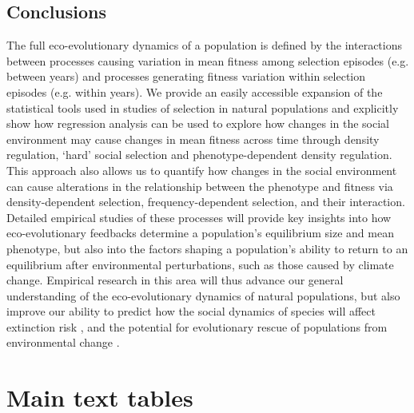\documentclass{article}
\begin{document}
\subsection{Conclusions}
 The full eco-evolutionary dynamics of a population is defined by the interactions between processes causing variation in mean fitness among selection episodes (e.g. between years) and processes generating fitness variation within selection episodes (e.g. within years). We provide an easily accessible expansion of the statistical tools used in studies of selection in natural populations and explicitly show how regression analysis can be used to explore how changes in the social environment may cause changes in mean fitness across time through density regulation, `hard' social selection and phenotype-dependent density regulation. This approach also allows us to quantify how changes in the social environment can cause alterations in the relationship between the phenotype and fitness via density-dependent selection, frequency-dependent selection, and their interaction. Detailed empirical studies of these processes will provide key insights into how eco-evolutionary feedbacks determine a population's equilibrium size and mean phenotype, but also into the factors shaping a population's ability to return to an equilibrium after environmental perturbations, such as those caused by climate change. Empirical research in this area will thus advance our general understanding of the eco-evolutionary dynamics of natural populations, but also improve our ability to predict how the social dynamics of species will affect extinction risk \citep{Angulo2018}, and the potential for evolutionary rescue of populations from environmental change \citep{Chevin2010}.





\newpage
\section{Main text tables}
\end{document}
